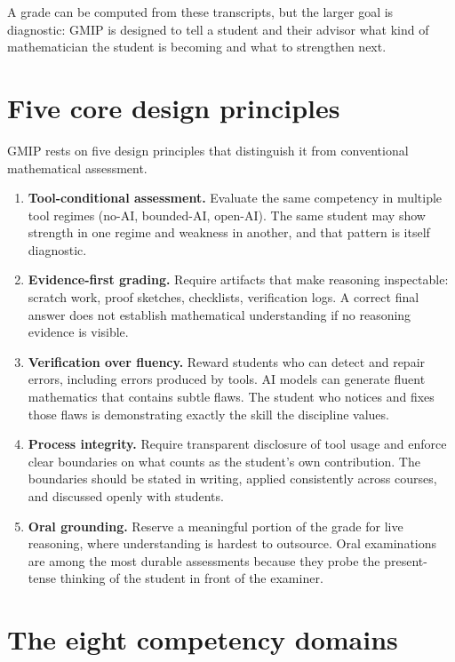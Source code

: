 \documentclass{SIAMbook2023}
\begin{document}
A grade can be computed from these transcripts, but the larger goal is diagnostic: GMIP is designed to tell a student and their advisor what kind of mathematician the student is becoming and what to strengthen next.

\section{Five core design principles}

GMIP rests on five design principles that distinguish it from conventional mathematical assessment.

\begin{enumerate}
\item \textbf{Tool-conditional assessment.} Evaluate the same competency in multiple tool regimes (no-AI, bounded-AI, open-AI). The same student may show strength in one regime and weakness in another, and that pattern is itself diagnostic.

\item \textbf{Evidence-first grading.} Require artifacts that make reasoning inspectable: scratch work, proof sketches, checklists, verification logs. A correct final answer does not establish mathematical understanding if no reasoning evidence is visible.

\item \textbf{Verification over fluency.} Reward students who can detect and repair errors, including errors produced by tools. AI models can generate fluent mathematics that contains subtle flaws. The student who notices and fixes those flaws is demonstrating exactly the skill the discipline values.

\item \textbf{Process integrity.} Require transparent disclosure of tool usage and enforce clear boundaries on what counts as the student's own contribution. The boundaries should be stated in writing, applied consistently across courses, and discussed openly with students.

\item \textbf{Oral grounding.} Reserve a meaningful portion of the grade for live reasoning, where understanding is hardest to outsource. Oral examinations are among the most durable assessments because they probe the present-tense thinking of the student in front of the examiner.
\end{enumerate}

\section{The eight competency domains}
\end{document}
